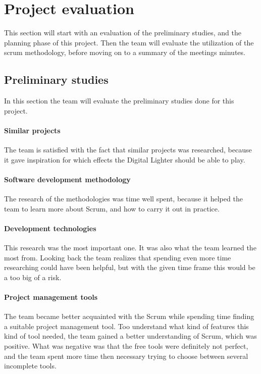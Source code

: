 \section{Project evaluation}
This section will start with an evaluation of the preliminary studies, and the planning phase of this project.  
Then the team will evaluate the utilization of the scrum methodology, before moving on to a summary of the meetings minutes. 

\subsection{Preliminary studies}
In this section the team will evaluate the preliminary studies done for this project.
\paragraph{Similar projects} 
The team is satisfied with the fact that similar projects was researched, because it gave inspiration for which effects the Digital Lighter should be able to play. 

\paragraph{Software development methodology}
The research of the methodologies was time well spent, because it helped the team to learn more about Scrum, and how to carry it out in practice.

\paragraph{Development technologies}
This research was the most important one. It was also what the team learned the most from. Looking back the team realizes that spending even more time researching could have been helpful, but with the given time frame this would be a too big of a risk.

\paragraph{Project management tools}
The team became better acquainted with the Scrum while spending time finding a suitable project management tool. Too understand what kind of features this kind of tool needed, the team gained a better understanding of Scrum, which was positive. What was negative was that the free tools were definitely not perfect, and the team spent more time then necessary trying to choose between several incomplete tools. 


